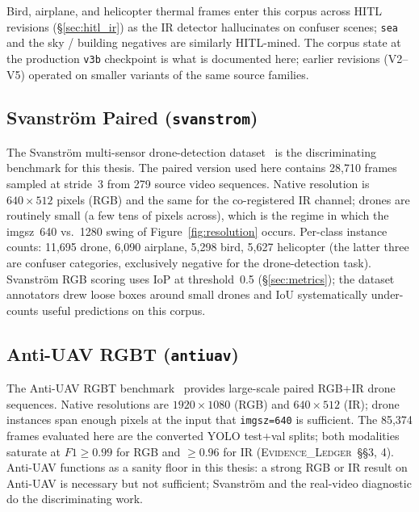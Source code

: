 \documentclass[12pt,a4paper,oneside,openright]{book}
\begin{document}
Bird, airplane, and helicopter thermal frames enter this corpus across HITL revisions (\S\ref{sec:hitl_ir}) as the IR detector hallucinates on confuser scenes; \texttt{sea} and the sky / building negatives are similarly HITL-mined. The corpus state at the production \texttt{v3b} checkpoint is what is documented here; earlier revisions (V2--V5) operated on smaller variants of the same source families.

\subsection{Svanstr\"om Paired (\texttt{svanstrom})}
\label{sec:ds_svanstrom}

The Svanstr\"om multi-sensor drone-detection dataset~\cite{svanstrom2021real,svanstrom2022dronedataset} is the discriminating benchmark for this thesis. The paired version used here contains 28{,}710 frames sampled at stride~3 from 279 source video sequences. Native resolution is $640{\times}512$ pixels (RGB) and the same for the co-registered IR channel; drones are routinely small (a few tens of pixels across), which is the regime in which the imgsz~640 vs.~1280 swing of Figure~\ref{fig:resolution} occurs. Per-class instance counts: 11{,}695 drone, 6{,}090 airplane, 5{,}298 bird, 5{,}627 helicopter (the latter three are confuser categories, exclusively negative for the drone-detection task). Svanstr\"om RGB scoring uses IoP at threshold~0.5 (\S\ref{sec:metrics}); the dataset annotators drew loose boxes around small drones and IoU systematically under-counts useful predictions on this corpus.

\subsection{Anti-UAV RGBT (\texttt{antiuav})}
\label{sec:ds_antiuav}

The Anti-UAV RGBT benchmark~\cite{jiang2021antiuav,zhao2023antiuav} provides large-scale paired RGB+IR drone sequences. Native resolutions are $1920{\times}1080$ (RGB) and $640{\times}512$ (IR); drone instances span enough pixels at the input that \texttt{imgsz=640} is sufficient. The 85{,}374 frames evaluated here are the converted YOLO test+val splits; both modalities saturate at $F1 \geq 0.99$ for RGB and $\geq 0.96$ for IR (\textsc{Evidence\_Ledger}~\S\S3, 4). Anti-UAV functions as a sanity floor in this thesis: a strong RGB or IR result on Anti-UAV is necessary but not sufficient; Svanstr\"om and the real-video diagnostic do the discriminating work.
\end{document}
